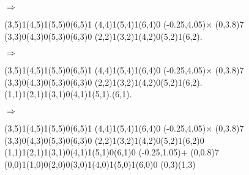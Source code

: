 \documentclass[11pt,a4paper]{article}
\begin{document}
\begin{center}
\begin{table}[ht!]
\begin{minipage}{0.1\textwidth}
$ \Rightarrow $

  \end{minipage}
  \hfillx
  \begin{minipage}{0.15\textwidth}

\par\vspace{6\oplineheight}
\oplput(3,5){1}\oplput(4,5){1}\oplput(5,5){0}\oplput(6,5){1}
\oplput(4,4){1}\oplput(5,4){1}\oplput(6,4){0}
\oplput(-0.25,4.05){$\times$}
\ophline(0,3.8){7}
\oplput(3,3){0}\oplput(4,3){0}\oplput(5,3){0}\oplput(6,3){0}
\oplput(2,2){1}\oplput(3,2){1}\oplput(4,2){0}\oplput(5,2){1}\oplput(6,2){.}

  \end{minipage}
  \hfillx
  \begin{minipage}{0.1\textwidth}
    \centering

$ \Rightarrow $

  \end{minipage}
  \hfillx
  \begin{minipage}{0.15\textwidth}

\par\vspace{6\oplineheight}
\oplput(3,5){1}\oplput(4,5){1}\oplput(5,5){0}\oplput(6,5){1}
\oplput(4,4){1}\oplput(5,4){1}\oplput(6,4){0}
\oplput(-0.25,4.05){$\times$}
\ophline(0,3.8){7}
\oplput(3,3){0}\oplput(4,3){0}\oplput(5,3){0}\oplput(6,3){0}
\oplput(2,2){1}\oplput(3,2){1}\oplput(4,2){0}\oplput(5,2){1}\oplput(6,2){.}
\oplput(1,1){1}\oplput(2,1){1}\oplput(3,1){0}\oplput(4,1){1}\oplput(5,1){.}\oplput(6,1){.}

  \end{minipage}
  \hfillx
  \begin{minipage}{0.1\textwidth}
    \centering

$ \Rightarrow $

  \end{minipage}
  \hfillx
  \begin{minipage}{0.15\textwidth}

\par\vspace{6\oplineheight}
\oplput(3,5){1}\oplput(4,5){1}\oplput(5,5){0}\oplput(6,5){1}
\oplput(4,4){1}\oplput(5,4){1}\oplput(6,4){0}
\oplput(-0.25,4.05){$\times$}
\ophline(0,3.8){7}
\oplput(3,3){0}\oplput(4,3){0}\oplput(5,3){0}\oplput(6,3){0}
\oplput(2,2){1}\oplput(3,2){1}\oplput(4,2){0}\oplput(5,2){1}\oplput(6,2){0}
\oplput(1,1){1}\oplput(2,1){1}\oplput(3,1){0}\oplput(4,1){1}\oplput(5,1){0}\oplput(6,1){0}
\oplput(-0.25,1.05){$+$}
\ophline(0,0.8){7}
\oplput(0,0){1}\oplput(1,0){0}\oplput(2,0){0}\oplput(3,0){1}\oplput(4,0){1}\oplput(5,0){1}\oplput(6,0){0}
\oplput(0,3){\tiny {}}\oplput(1,3){\tiny {}}


\end{minipage}
\end{table}
\end{center}
\end{document}
